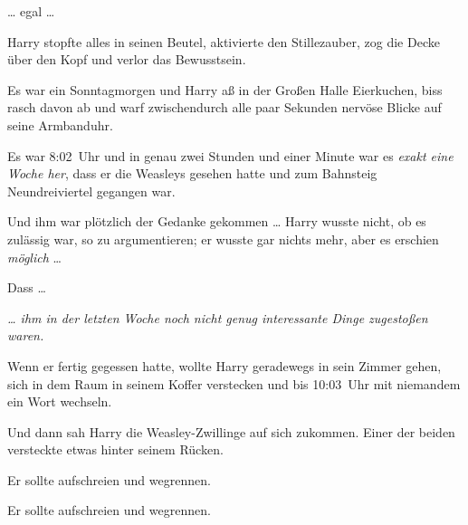 … egal …

Harry stopfte alles in seinen Beutel, aktivierte den Stillezauber, zog die Decke über den Kopf und verlor das Bewusstsein.

\later

Es war ein Sonntagmorgen und Harry aß in der Großen Halle Eierkuchen, biss rasch davon ab und warf zwischendurch alle paar Sekunden nervöse Blicke auf seine Armbanduhr.

Es war 8:02~Uhr und in genau zwei Stunden und einer Minute war es \emph{exakt eine Woche her}, dass er die Weasleys gesehen hatte und zum Bahnsteig Neundreiviertel gegangen war.

Und ihm war plötzlich der Gedanke gekommen … Harry wusste nicht, ob es zulässig war, so zu argumentieren; er wusste gar nichts mehr, aber es erschien \emph{möglich} …

Dass …

\emph{… ihm in der letzten Woche noch nicht genug interessante Dinge zugestoßen waren.}

Wenn er fertig gegessen hatte, wollte Harry geradewegs in sein Zimmer gehen, sich in dem Raum in seinem Koffer verstecken und bis 10:03~Uhr mit niemandem ein Wort wechseln.

Und dann sah Harry die Weasley-Zwillinge auf sich zukommen. Einer der beiden versteckte etwas hinter seinem Rücken.

Er sollte aufschreien und wegrennen.

Er sollte aufschreien und wegrennen.

